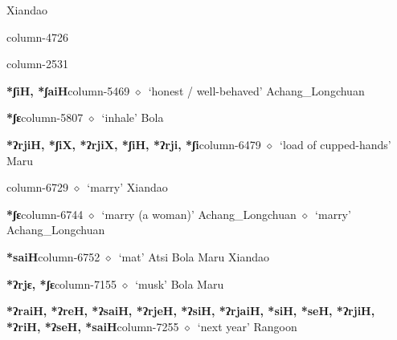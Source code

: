          Xiandao 
  \item {\footnotesize \textbf{}}{\tiny column-4726}
  \item {\footnotesize \textbf{}}{\tiny column-2531}
  \item {\footnotesize \textbf{*ʃiH, *ʃaiH}}{\tiny column-5469}
         $\diamond$~`honest / well-behaved'
         Achang\_Longchuan 
  \item {\footnotesize \textbf{*ʃɛ}}{\tiny column-5807}
         $\diamond$~`inhale'
         Bola 
  \item {\footnotesize \textbf{*ʔrjiH, *ʃiX, *ʔrjiX, *ʃiH, *ʔrji, *ʃi}}{\tiny column-6479}
         $\diamond$~`load of cupped-hands'
         Maru 
  \item {\footnotesize \textbf{}}{\tiny column-6729}
         $\diamond$~`marry'
         Xiandao 
  \item {\footnotesize \textbf{*ʃɛ}}{\tiny column-6744}
         $\diamond$~`marry (a woman)'
         Achang\_Longchuan 
\hspace{1ex}
         $\diamond$~`marry'
         Achang\_Longchuan 
  \item {\footnotesize \textbf{*saiH}}{\tiny column-6752}
         $\diamond$~`mat'
         Atsi 
\hspace{1ex}
         Bola 
\hspace{1ex}
         Maru 
\hspace{1ex}
         Xiandao 
  \item {\footnotesize \textbf{*ʔrjɛ, *ʃɛ}}{\tiny column-7155}
         $\diamond$~`musk'
         Bola 
\hspace{1ex}
         Maru 
  \item {\footnotesize \textbf{*ʔraiH, *ʔreH, *ʔsaiH, *ʔrjeH, *ʔsiH, *ʔrjaiH, *siH, *seH, *ʔrjiH, *ʔriH, *ʔseH, *saiH}}{\tiny column-7255}
         $\diamond$~`next year'
         Rangoon 
\hspace{1ex}

